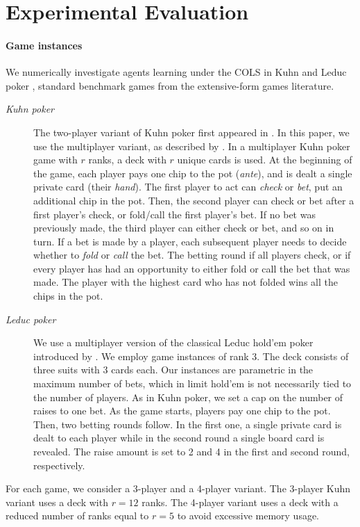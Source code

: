 \section{Experimental Evaluation}\label{app:experiments}

\paragraph{Game instances}
We numerically investigate agents learning under the COLS in Kuhn and Leduc poker \citep{Kuhn50:Simplified,Southey05:Bayes}, standard benchmark games from the extensive-form games literature.
\begin{description}
    \item[\emph{Kuhn poker}] The two-player variant of Kuhn poker first appeared in \citep{Kuhn50:Simplified}. In this paper, we use the multiplayer variant, as described by \citet{Farina18:Ex}. In a multiplayer Kuhn poker game with $r$ ranks, a deck with $r$ unique cards is used. At the beginning of the game, each player pays one chip to the pot (\emph{ante}), and is dealt a single private card (their \emph{hand}). The first player to act can \emph{check} or \emph{bet}, \ie put an additional chip in the pot. Then, the second player can check or bet after a first player's check, or fold/call the first player's bet. If no bet was previously made, the third player can either check or bet, and so on in turn. If a bet is made by a player, each subsequent player needs to decide whether to \emph{fold} or \emph{call} the bet. The betting round if all players check, or if every player has had an opportunity to either fold or call the bet that was made. The player with the highest card who has not folded wins all the chips in the pot.
    \item[\emph{Leduc poker}] We use a multiplayer version of the classical Leduc hold'em poker introduced by \citet{Southey05:Bayes}. We employ game instances of rank 3. The deck consists of three suits with 3 cards each. Our instances are parametric in the maximum number of bets, which in limit hold'em is not necessarily tied to the number of players. As in Kuhn poker, we set a cap on the number of raises to one bet. As the game starts, players pay one chip to the pot. Then, two betting rounds follow. In the first one, a single private card is dealt to each player while in the second round a single board card is revealed. The raise amount is set to 2 and 4 in the first and second round, respectively.
\end{description}
For each game, we consider a 3-player and a 4-player variant. The 3-player Kuhn variant uses a deck with $r=12$ ranks. The 4-player variant uses a deck with a reduced number of ranks equal to $r=5$ to avoid excessive memory usage.

